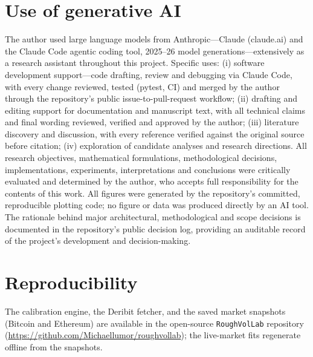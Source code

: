 \documentclass[11pt,a4paper]{article}
\numberwithin{equation}{section}
\begin{document}
\section*{Use of generative AI}
The author used large language models from Anthropic---Claude (claude.ai) and the Claude
Code agentic coding tool, 2025--26 model generations---extensively as a research assistant
throughout this project. Specific uses: (i) software development support---code drafting,
review and debugging via Claude Code, with every change reviewed, tested (pytest, CI) and
merged by the author through the repository's public issue-to-pull-request workflow;
(ii) drafting and editing support for documentation and manuscript text, with all technical
claims and final wording reviewed, verified and approved by the author; (iii) literature
discovery and discussion, with every reference verified against the original source before
citation; (iv) exploration of candidate analyses and research directions. All research
objectives, mathematical formulations, methodological decisions, implementations,
experiments, interpretations and conclusions were critically evaluated and determined by
the author, who accepts full responsibility for the contents of this work. All figures
were generated by the repository's committed, reproducible plotting code; no figure or
data was produced directly by an AI tool. The rationale behind major architectural,
methodological and scope decisions is documented in the repository's public decision log,
providing an auditable record of the project's development and decision-making.

\section*{Reproducibility}
The calibration engine, the Deribit fetcher, and the saved market snapshots (Bitcoin and
Ethereum) are available in the open-source \texttt{RoughVolLab} repository
(\url{https://github.com/Michaellumor/roughvollab}); the live-market fits regenerate offline
from the snapshots.
\end{document}
